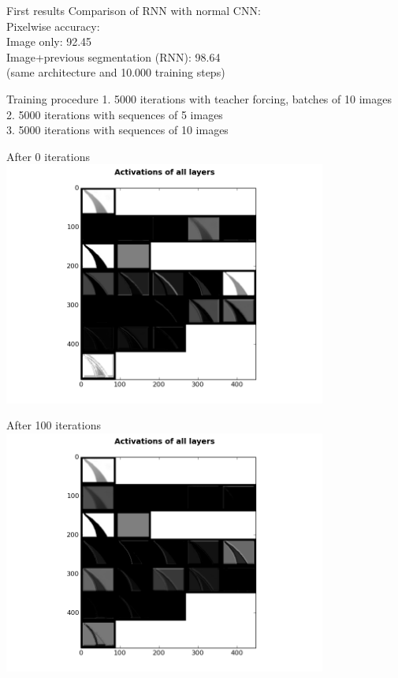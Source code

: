 \begin{frame}{First results}
Comparison of RNN with normal CNN:\\
Pixelwise accuracy:\\
Image only: 92.45 \\
Image+previous segmentation (RNN): 98.64 \\
(same architecture and 10.000 training steps)
\end{frame}

\begin{frame}{Training procedure}
1. 5000 iterations with teacher forcing, batches of 10 images\\
2. 5000 iterations with sequences of 5 images\\
3. 5000 iterations with sequences of 10 images\\
\end{frame}

\begin{frame}{After 0 iterations}
\includegraphics[height=8.0cm]{data/activations/output-0.png}\\ 
\end{frame}

\begin{frame}{After 100 iterations}
\includegraphics[height=8.0cm]{data/activations/output-100.png}\\ 
\end{frame}

